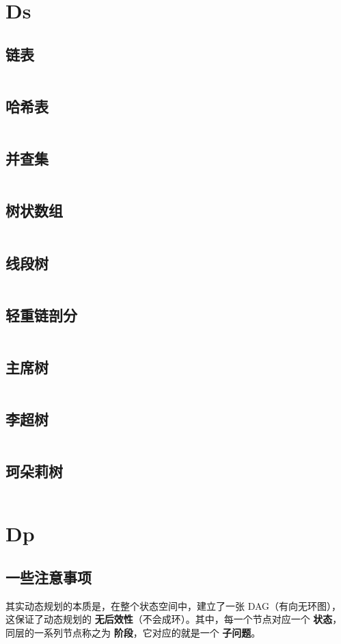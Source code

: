 \documentclass[titlepage, a4paper]{article}
\begin{document}
\begin{multicols}{2}
\begin{spacing}{0.6}
			 \section{Ds}
			 	\subsection{链表}
			 		\inputminted{cpp}{src/Ds/List.cpp}
			 	\subsection{哈希表}
			 		\inputminted{cpp}{src/Ds/Hash_table.cpp}
			 	\subsection{并查集}
			 		\inputminted{cpp}{src/Ds/Dsu.cpp}
			 	\subsection{树状数组}
			 		\inputminted{cpp}{src/Ds/Fenwick_tree.cpp}
			 	\subsection{线段树}
			 		\inputminted{cpp}{src/Ds/Segment_tree.cpp}
			 	\subsection{轻重链剖分}
			 		\inputminted{cpp}{src/Ds/Hld.cpp}
			 	\subsection{主席树}
			 		\inputminted{cpp}{src/Ds/Persistent_seg.cpp}
			 	\subsection{李超树}
			 		\inputminted{cpp}{src/Ds/Li_chao_tree.cpp}
			 	\subsection{珂朵莉树}
			 		\inputminted{cpp}{src/Ds/Odt.cpp}
			 \section{Dp}
			 	\subsection{一些注意事项}
			 		其实动态规划的本质是，在整个状态空间中，建立了一张 DAG（有向无环图），这保证了动态规划的 \textbf{无后效性}（不会成环）。其中，每一个节点对应一个 \textbf{状态}，同层的一系列节点称之为 \textbf{阶段}，它对应的就是一个 \textbf{子问题}。
			 		

\end{spacing}
\end{multicols}
\end{document}
